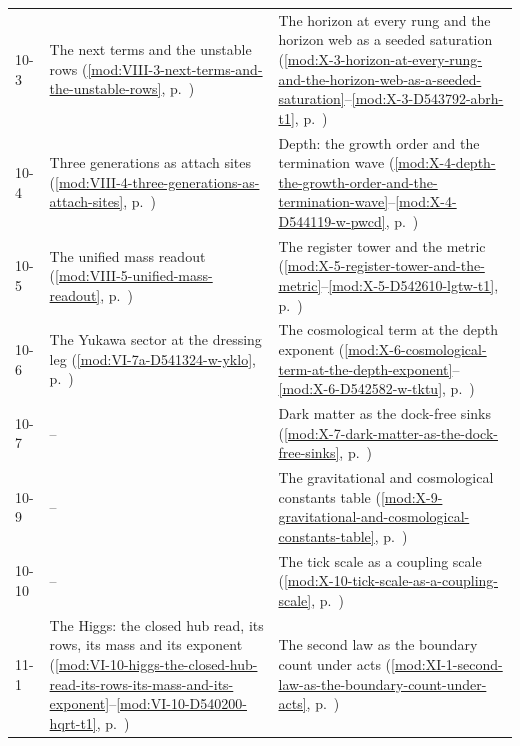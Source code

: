 {\begin{longtable}{p{11mm}p{70mm}p{60mm}}
10-3 & The next terms and the unstable rows (\ref{mod:VIII-3-next-terms-and-the-unstable-rows}, p.~\pageref{mod:VIII-3-next-terms-and-the-unstable-rows}) & The horizon at every rung and the horizon web as a seeded saturation (\ref{mod:X-3-horizon-at-every-rung-and-the-horizon-web-as-a-seeded-saturation}--\ref{mod:X-3-D543792-abrh-t1}, p.~\pageref{mod:X-3-horizon-at-every-rung-and-the-horizon-web-as-a-seeded-saturation}) \\
10-4 & Three generations as attach sites (\ref{mod:VIII-4-three-generations-as-attach-sites}, p.~\pageref{mod:VIII-4-three-generations-as-attach-sites}) & Depth: the growth order and the termination wave (\ref{mod:X-4-depth-the-growth-order-and-the-termination-wave}--\ref{mod:X-4-D544119-w-pwcd}, p.~\pageref{mod:X-4-depth-the-growth-order-and-the-termination-wave}) \\
10-5 & The unified mass readout (\ref{mod:VIII-5-unified-mass-readout}, p.~\pageref{mod:VIII-5-unified-mass-readout}) & The register tower and the metric (\ref{mod:X-5-register-tower-and-the-metric}--\ref{mod:X-5-D542610-lgtw-t1}, p.~\pageref{mod:X-5-register-tower-and-the-metric}) \\
10-6 & The Yukawa sector at the dressing leg (\ref{mod:VI-7a-D541324-w-yklo}, p.~\pageref{mod:VI-7a-D541324-w-yklo}) & The cosmological term at the depth exponent (\ref{mod:X-6-cosmological-term-at-the-depth-exponent}--\ref{mod:X-6-D542582-w-tktu}, p.~\pageref{mod:X-6-cosmological-term-at-the-depth-exponent}) \\
10-7 & -- & Dark matter as the dock-free sinks (\ref{mod:X-7-dark-matter-as-the-dock-free-sinks}, p.~\pageref{mod:X-7-dark-matter-as-the-dock-free-sinks}) \\
10-9 & -- & The gravitational and cosmological constants table (\ref{mod:X-9-gravitational-and-cosmological-constants-table}, p.~\pageref{mod:X-9-gravitational-and-cosmological-constants-table}) \\
10-10 & -- & The tick scale as a coupling scale (\ref{mod:X-10-tick-scale-as-a-coupling-scale}, p.~\pageref{mod:X-10-tick-scale-as-a-coupling-scale}) \\
11-1 & The Higgs: the closed hub read, its rows, its mass and its exponent (\ref{mod:VI-10-higgs-the-closed-hub-read-its-rows-its-mass-and-its-exponent}--\ref{mod:VI-10-D540200-hqrt-t1}, p.~\pageref{mod:VI-10-higgs-the-closed-hub-read-its-rows-its-mass-and-its-exponent}) & The second law as the boundary count under acts (\ref{mod:XI-1-second-law-as-the-boundary-count-under-acts}, p.~\pageref{mod:XI-1-second-law-as-the-boundary-count-under-acts}) \\

\end{longtable}}
